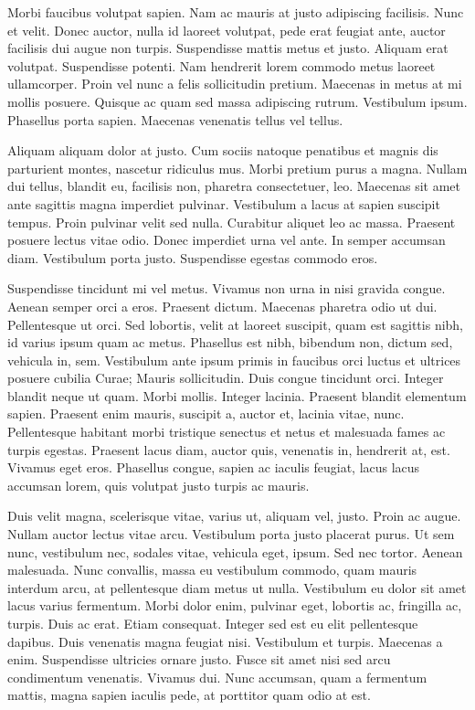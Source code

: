 Morbi faucibus volutpat sapien. Nam ac mauris at justo adipiscing facilisis.
Nunc et velit. Donec auctor, nulla id laoreet volutpat, pede erat feugiat ante,
auctor facilisis dui augue non turpis. Suspendisse mattis metus et justo.
Aliquam erat volutpat. Suspendisse potenti. Nam hendrerit lorem commodo metus
laoreet ullamcorper. Proin vel nunc a felis sollicitudin pretium. Maecenas in
metus at mi mollis posuere. Quisque ac quam sed massa adipiscing rutrum.
Vestibulum ipsum. Phasellus porta sapien. Maecenas venenatis tellus vel tellus.

Aliquam aliquam dolor at justo. Cum sociis natoque penatibus et magnis dis
parturient montes, nascetur ridiculus mus. Morbi pretium purus a magna. Nullam
dui tellus, blandit eu, facilisis non, pharetra consectetuer, leo. Maecenas sit
amet ante sagittis magna imperdiet pulvinar. Vestibulum a lacus at sapien
suscipit tempus. Proin pulvinar velit sed nulla. Curabitur aliquet leo ac massa.
Praesent posuere lectus vitae odio. Donec imperdiet urna vel ante. In semper
accumsan diam. Vestibulum porta justo. Suspendisse egestas commodo eros.

Suspendisse tincidunt mi vel metus. Vivamus non urna in nisi gravida congue.
Aenean semper orci a eros. Praesent dictum. Maecenas pharetra odio ut dui.
Pellentesque ut orci. Sed lobortis, velit at laoreet suscipit, quam est sagittis
nibh, id varius ipsum quam ac metus. Phasellus est nibh, bibendum non, dictum
sed, vehicula in, sem. Vestibulum ante ipsum primis in faucibus orci luctus et
ultrices posuere cubilia Curae; Mauris sollicitudin. Duis congue tincidunt orci.
Integer blandit neque ut quam. Morbi mollis. Integer lacinia. Praesent blandit
elementum sapien. Praesent enim mauris, suscipit a, auctor et, lacinia vitae,
nunc. Pellentesque habitant morbi tristique senectus et netus et malesuada fames
ac turpis egestas. Praesent lacus diam, auctor quis, venenatis in, hendrerit at,
est. Vivamus eget eros. Phasellus congue, sapien ac iaculis feugiat, lacus lacus
accumsan lorem, quis volutpat justo turpis ac mauris.

Duis velit magna, scelerisque vitae, varius ut, aliquam vel, justo. Proin ac
augue. Nullam auctor lectus vitae arcu. Vestibulum porta justo placerat purus.
Ut sem nunc, vestibulum nec, sodales vitae, vehicula eget, ipsum. Sed nec
tortor. Aenean malesuada. Nunc convallis, massa eu vestibulum commodo, quam
mauris interdum arcu, at pellentesque diam metus ut nulla. Vestibulum eu dolor
sit amet lacus varius fermentum. Morbi dolor enim, pulvinar eget, lobortis ac,
fringilla ac, turpis. Duis ac erat. Etiam consequat. Integer sed est eu elit
pellentesque dapibus. Duis venenatis magna feugiat nisi. Vestibulum et turpis.
Maecenas a enim. Suspendisse ultricies ornare justo. Fusce sit amet nisi sed
arcu condimentum venenatis. Vivamus dui. Nunc accumsan, quam a fermentum mattis,
magna sapien iaculis pede, at porttitor quam odio at est.

